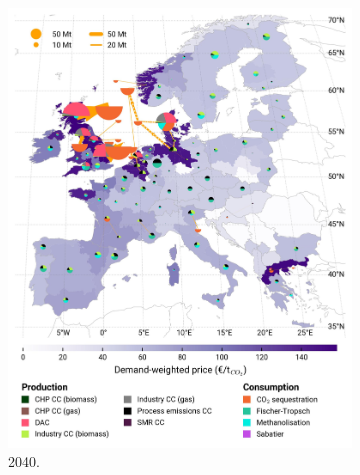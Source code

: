 \documentclass[final,5p,times,twocolumn,sort&compress]{elsarticle}
\begin{document}
\begin{figure}[htbp]
\begin{subfigure}[t]{0.4\textwidth}
      \includegraphics[width=1\textwidth,trim=0cm 3.2cm 0cm 0cm, clip]{maps/pcipmi/base_s_adm___2040-balance_map_co2_stored} 
      \vspace{-0.5cm}
      \caption{ 2040.}
      \label{fig:PCI_lt_2040_co2}
  \end{subfigure}
  \begin{subfigure}[t]{0.4\textwidth}
      \vspace{0pt}

\end{subfigure}
\end{figure}
\end{document}
